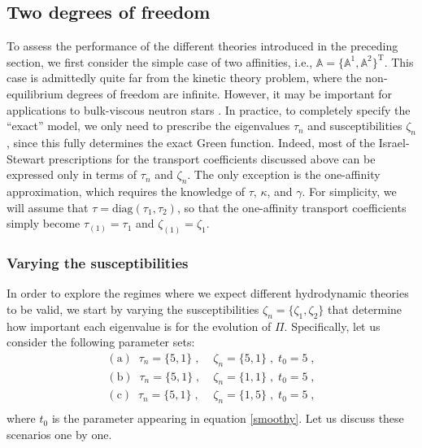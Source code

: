 \documentclass[a4paper, amsfonts, amssymb, amsmath, reprint, showkeys, nofootinbib, twoside, onecolumn,notitlepage]{revtex4-2}
\begin{document}
\subsection{Two degrees of freedom}

To assess the performance of the different theories introduced in the preceding section, we first consider the simple case of two affinities, i.e., $\mathbb{A}=\{\mathbb{A}^1,\mathbb{A}^2\}^{\mathrm{T}}$. This case is admittedly quite far from the kinetic theory problem, where the non-equilibrium degrees of freedom are infinite. However, it may be important for applications to bulk-viscous neutron stars \cite{Camelio2022,GavassinoBurgers2023}. In practice, to completely specify the ``exact'' model, we only need to prescribe the eigenvalues $\tau_n$ and susceptibilities $\zeta_n$, since this fully determines the exact Green function. Indeed, most of the Israel-Stewart prescriptions for the transport coefficients discussed above can be expressed only in terms of $\tau_n$ and $\zeta_n$. The only exception is the one-affinity approximation, which requires the  knowledge of $\tau$, $\kappa$, and $\gamma$. For simplicity, we will assume that $\tau=\text{diag}(\tau_1,\tau_2)$, so that the one-affinity transport coefficients simply become $\tau_{(1)}=\tau_1$ and $\zeta_{(1)}=\zeta_1$. 

\subsubsection{Varying the susceptibilities}
In order to explore the regimes where we expect different hydrodynamic theories to be valid, we start by varying the susceptibilities $\zeta_n=\{\zeta_1,\zeta_2\}$ that determine how important each eigenvalue is for the evolution of $\Pi$.
Specifically, let us consider the following parameter sets:
\begin{equation*}
\begin{split}
    \mathrm{(a)}\;\; \tau_n=\{5,1\}\;, & \;\zeta_n=\{5,1\}\;,\; t_0=5\;, \\
    \mathrm{(b)}\;\; \tau_n=\{5,1\}\;, & \;\zeta_n=\{1,1\}\;,\;t_0=5\;, \\
    \mathrm{(c)}\;\; \tau_n=\{5,1\}\;, & \;\zeta_n=\{1,5\}\;,\;t_0=5\;, \\
    \end{split}
\end{equation*}
where $t_0$ is the parameter appearing in equation \eqref{smoothy}. Let us discuss these scenarios one by one.
\end{document}
